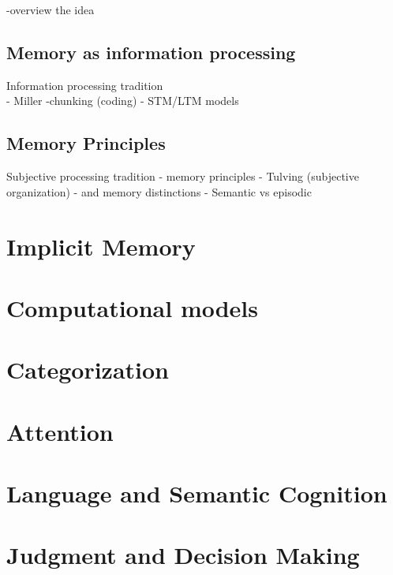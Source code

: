 \documentclass[
  oneside,
  12pt]{crumpbook}
\begin{document}
-overview the idea

\hypertarget{memory-as-information-processing}{%
\section{Memory as information processing}\label{memory-as-information-processing}}

Information processing tradition\\
- Miller
-chunking (coding)
- STM/LTM models

\hypertarget{memory-principles}{%
\section{Memory Principles}\label{memory-principles}}

Subjective processing tradition
- memory principles
- Tulving (subjective organization)
- and memory distinctions
- Semantic vs episodic

\hypertarget{implicit-memory}{%
\chapter{Implicit Memory}\label{implicit-memory}}

\hypertarget{computational-models}{%
\chapter{Computational models}\label{computational-models}}

\hypertarget{categorization}{%
\chapter{Categorization}\label{categorization}}

\hypertarget{attention}{%
\chapter{Attention}\label{attention}}

\hypertarget{language-and-semantic-cognition}{%
\chapter{Language and Semantic Cognition}\label{language-and-semantic-cognition}}

\hypertarget{judgment-and-decision-making}{%
\chapter{Judgment and Decision Making}\label{judgment-and-decision-making}}
\end{document}

